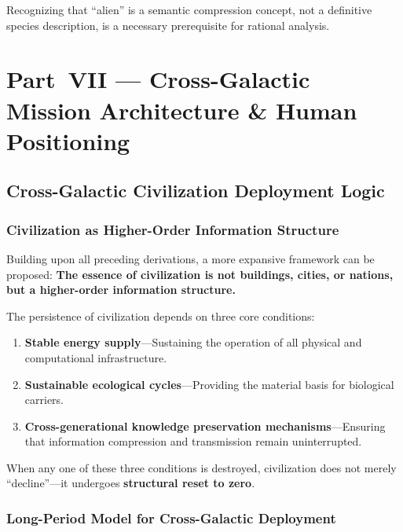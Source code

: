 \documentclass[aps,prd,twocolumn,superscriptaddress,nofootinbib]{revtex4-2}
\begin{document}
Recognizing that ``alien'' is a semantic compression concept, not a definitive species description, is a necessary prerequisite for rational analysis.


\section{Part~VII --- Cross-Galactic Mission Architecture \& Human Positioning}\label{sec:part7}

\subsection{Cross-Galactic Civilization Deployment Logic}\label{sec:deployment-logic}

\subsubsection{Civilization as Higher-Order Information Structure}\label{sec:info-structure}

Building upon all preceding derivations, a more expansive framework can be proposed: \textbf{The essence of civilization is not buildings, cities, or nations, but a higher-order information structure.}

The persistence of civilization depends on three core conditions:

\begin{enumerate}
  \item \textbf{Stable energy supply}---Sustaining the operation of all physical and computational infrastructure.
  \item \textbf{Sustainable ecological cycles}---Providing the material basis for biological carriers.
  \item \textbf{Cross-generational knowledge preservation mechanisms}---Ensuring that information compression and transmission remain uninterrupted.
\end{enumerate}

When any one of these three conditions is destroyed, civilization does not merely ``decline''---it undergoes \textbf{structural reset to zero}.

\subsubsection{Long-Period Model for Cross-Galactic Deployment}\label{sec:long-period}
\end{document}
